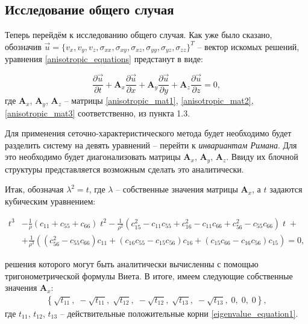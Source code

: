 \subsection{Исследование общего случая}

Теперь перейдём к исследованию общего случая.
Как уже было сказано, обозначив $\vec{u}=\{v_x,v_y,v_z,\sigma_{xx},\sigma_{xy},\sigma_{xz},\sigma_{yy},\sigma_{yz},\sigma_{zz}\}^T$ -- вектор искомых решений, уравнения \eqref{anisotropic_equations} предстанут в виде:

\begin{equation}
	\label{matrix_anisotropy_equation}
	\frac{\partial\vec{u}}{\partial{t}}+\mathbf{A}_x\frac{\partial\vec{u}}{\partial{x}}+
	\mathbf{A}_y\frac{\partial\vec{u}}{\partial{y}}+
	\mathbf{A}_z\frac{\partial\vec{u}}{\partial{z}}=0,
\end{equation}
	где $\mathbf{A}_x$, $\mathbf{A}_y$, $\mathbf{A}_z$ -- матрицы \eqref{anisotropic_mat1}, \eqref{anisotropic_mat2}, \eqref{anisotropic_mat3} соответственно, из пункта 1.3.
	
	Для применения сеточно-характеристического метода будет необходимо будет разделить систему на девять уравнений -- перейти к \textit{инвариантам Римана}.
	Для это необходимо будет диагонализовать матрицы $\mathbf{A}_x$, $\mathbf{A}_y$, $\mathbf{A}_z$.
	Ввиду их блочной структуры представляется возможным сделать это аналитически\cite{favorskaya}.
	
	Итак, обозначая  $\lambda^{2} = t$, где $\lambda$ -- собственные значения матрицы $\mathbf{A}_x$, а $t$ задаются кубическим уравнением:
\begin{small}
\begin{align}	
	\label{eigenvalue_equation1}
	t^{3} &- \frac{1}{\rho}(c_{11} + c_{55} + c_{66})\;t^{2} - \frac{1}{\rho^{2}}(c_{15}^{2} - c_{11}c_{55} + c_{16}^{2} - c_{11}c_{66} + c_{56}^{2} - c_{55}c_{66})\;t\;+ \nonumber\\
	&+ \frac{1}{\rho^{3}}((c_{56}^{2} - c_{55}c_{66})c_{11} + (c_{16}c_{55} - c_{15}c_{56})c_{16} + (c_{15}c_{66} - c_{16}c_{56})c_{15}) = 0,
\end{align}
\end{small}
	решения которого могут быть аналитически вычисленны с помощью тригонометрической формулы Виета. В итоге, имеем следующие собственные значения $\mathbf{A}_x$:
\begin{align}
	\left\{\sqrt{t_{11}},\;-\sqrt{t_{11}},\;\sqrt{t_{12}},\;-\sqrt{t_{12}},\;\sqrt{t_{13}},\;-\sqrt{t_{13}},\;0,\;0,\;0\right\},
\end{align}
	где $t_{11}$, $t_{12}$, $t_{13}$ -- действительные положительные корни \eqref{eigenvalue_equation1}.
	
